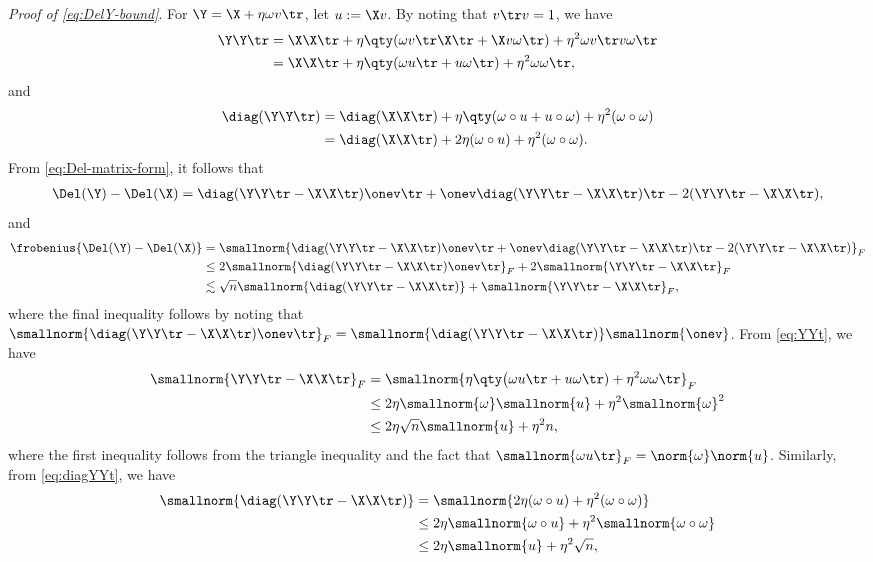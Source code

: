\documentclass[10pt]{article}
\begin{document}
\noindent\textit{Proof of \ref{eq:DelY-bound}}.\quad
For $\Y = \X + \eta \omega v\tr$, let $u := \X v$. By noting that $v\tr v = 1$, we have
\begin{align}
    \Y\Y\tr 
    &= \X\X\tr + \eta\qty(\omega v\tr\X\tr + \X v \omega\tr) + \eta^2\omega v\tr v\omega\tr\\
    &= \X\X\tr + \eta\qty(\omega u\tr + u\omega\tr) + \eta^2\omega\omega\tr,\label{eq:YYt}
\end{align}
and
\begin{align}
    \diag(\Y\Y\tr) 
    &= \diag(\X\X\tr) + \eta \qty( \omega \circ u + u \circ \omega ) + \eta^2 (\omega \circ \omega)\\ 
    &= \diag(\X\X\tr) + 2\eta (\omega \circ u) + \eta^2 (\omega \circ \omega).\label{eq:diagYYt}
\end{align}
From \cref{eq:Del-matrix-form}, it follows that
\begin{align}
    \Del(\Y) - \Del(\X) = \diag(\Y\Y\tr - \X\X\tr)\onev\tr + \onev\diag(\Y\Y\tr - \X\X\tr)\tr - 2(\Y\Y\tr - \X\X\tr),
\end{align}
and
\begin{align}
    \frobenius{\Del(\Y) - \Del(\X)}
    &= \smallnorm{\diag(\Y\Y\tr - \X\X\tr)\onev\tr + \onev\diag(\Y\Y\tr - \X\X\tr)\tr - 2(\Y\Y\tr - \X\X\tr)}_F\\
    &\le 2\smallnorm{\diag(\Y\Y\tr - \X\X\tr)\onev\tr}_F + 2\smallnorm{\Y\Y\tr - \X\X\tr}_F\\
    &\lesssim \sqrt{n}\smallnorm{\diag(\Y\Y\tr - \X\X\tr)} + \smallnorm{\Y\Y\tr - \X\X\tr}_F,
\end{align}
where the final inequality follows by noting that ${\smallnorm{\diag(\Y\Y\tr - \X\X\tr)\onev\tr}_F = \smallnorm{\diag(\Y\Y\tr - \X\X\tr)} \smallnorm{\onev}}$. From \cref{eq:YYt}, we have
\begin{align}
    \smallnorm{\Y\Y\tr - \X\X\tr}_F 
    &= \smallnorm{\eta\qty\big(\omega u\tr + u\omega\tr) + \eta^2\omega\omega\tr}_F\\
    &\le 2\eta\smallnorm{\omega}\smallnorm{u} + \eta^2\smallnorm{\omega}^2\\
    &\le 2\eta\sqrt{n}\smallnorm{u} + \eta^2n,\label{eq:YYt-bound}
\end{align}
where the first inequality follows from the triangle inequality and the fact that $\smallnorm{\omega u\tr}_F = \norm{\omega}\norm{u}$. Similarly, from \cref{eq:diagYYt}, we have
\begin{align}
    \smallnorm{\diag(\Y\Y\tr - \X\X\tr)} 
    &= \smallnorm{2\eta (\omega \circ u) + \eta^2 (\omega \circ \omega)}\\
    &\le 2\eta\smallnorm{\omega \circ u} + \eta^2\smallnorm{\omega \circ \omega}\\
    &\le 2\eta\smallnorm{u} + \eta^2\sqrt{n},\label{eq:diagYYt-bound}
\end{align}
\end{document}

